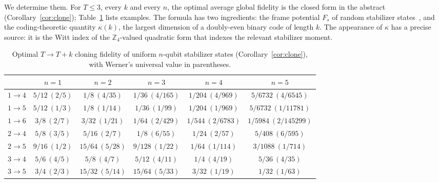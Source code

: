 \documentclass[11pt]{article}
\theoremstyle{definition}
\theoremstyle{remark}
\begin{document}
We determine them. For $T\le3$, every $k$ and every $n$, the optimal average global fidelity is the closed form in the
abstract (Corollary~\ref{cor:clone}); Table~\ref{tab:values} lists examples. The formula has two ingredients: the
frame potential $F_s$ of random stabilizer states~\cite{GNW2021}\cite[Thm.~2]{KuengGross2015}, and the coding-theoretic quantity $\kappa(k)$, the
largest dimension of a doubly-even binary code of length $k$. The appearance of $\kappa$ has a precise source: it is
the Witt index of the $\mathbb Z_4$-valued quadratic form that indexes the relevant stabilizer moment.

\begin{table}[ht]
\centering\small
\caption{Optimal $T\to T+k$ cloning fidelity of uniform $n$-qubit stabilizer states (Corollary~\ref{cor:clone}),
with Werner's universal value in parentheses.}\label{tab:values}
\begin{tabular}{@{}lccccc@{}}\toprule
 & $n=1$ & $n=2$ & $n=3$ & $n=4$ & $n=5$\\\midrule
$1\to4$ & $5/12\ (2/5)$ & $1/8\ (4/35)$ & $1/36\ (4/165)$ & $1/204\ (4/969)$ & $5/6732\ (4/6545)$\\
$1\to5$ & $5/12\ (1/3)$ & $1/8\ (1/14)$ & $1/36\ (1/99)$ & $1/204\ (1/969)$ & $5/6732\ (1/11781)$\\
$1\to6$ & $3/8\ (2/7)$ & $3/32\ (1/21)$ & $1/64\ (2/429)$ & $1/544\ (2/6783)$ & $1/5984\ (2/145299)$\\
$2\to4$ & $5/8\ (3/5)$ & $5/16\ (2/7)$ & $1/8\ (6/55)$ & $1/24\ (2/57)$ & $5/408\ (6/595)$\\
$2\to5$ & $9/16\ (1/2)$ & $15/64\ (5/28)$ & $9/128\ (1/22)$ & $1/64\ (1/114)$ & $3/1088\ (1/714)$\\
$3\to4$ & $5/6\ (4/5)$ & $5/8\ (4/7)$ & $5/12\ (4/11)$ & $1/4\ (4/19)$ & $5/36\ (4/35)$\\
$3\to5$ & $3/4\ (2/3)$ & $15/32\ (5/14)$ & $15/64\ (5/33)$ & $3/32\ (1/19)$ & $1/32\ (1/63)$\\\bottomrule
\end{tabular}
\end{table}
\end{document}
